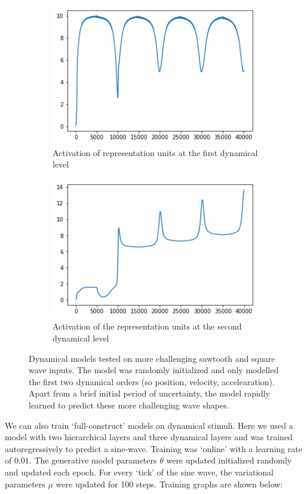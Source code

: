 \begin{figure}[H]
\bigskip
\begin{subfigure}{.3\linewidth}
    \centering
    \includegraphics[scale=0.4]{chapter_3_figures/sawtooth_mu1.png}
    \caption{Activation of representation units at the first dynamical level}
\end{subfigure}
   \hfill
\begin{subfigure}{.3\linewidth}
    \centering
    \includegraphics[scale=0.4]{chapter_3_figures/sawtooth_mu2.png}
    \caption{Activation of the representation units at the second dynamical level}
\end{subfigure}
\caption{Dynamical models tested on more challenging sawtooth and square wave inputs. The model was randomly initialized and only modelled the first two dynamical orders (so position, velocity, accelearation). Apart from a brief initial period of uncertainty, the model rapidly learned to predict these more challenging wave shapes.}
\end{figure}


We can also train `full-construct' models on dynamical stimuli. Here we used a model with two hierarchical layers and three dynamical layers and was trained autoregressively to predict a sine-wave. Training was `online' with a learning rate of $0.01$. The generative model parameters $\theta$ were updated initialized randomly and updated each epoch. For every `tick' of the sine wave, the variational parameters $\mu$ were updated for 100 steps. Training graphs are shown below:

